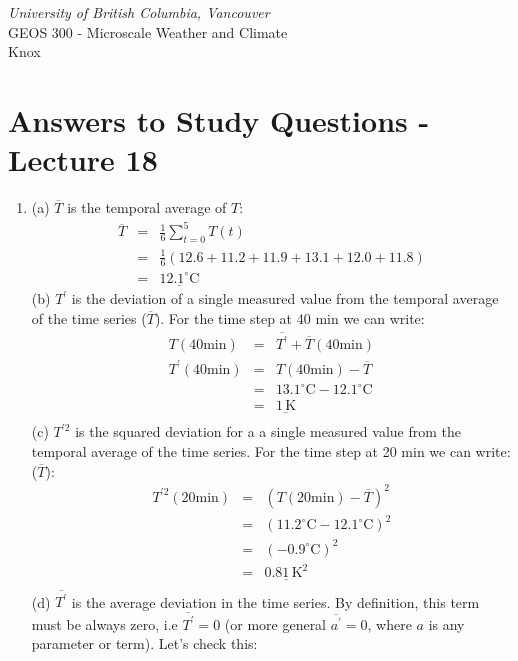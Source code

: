 \documentclass[11pt]{article}
\author{Andy Black and Andreas Christen}
\begin{document}
\begin{center}
\emph{University of British Columbia, Vancouver}\\
GEOS 300 - Microscale Weather and Climate\\
Knox
\section*{Answers to Study Questions - Lecture 18}
\end{center}

\begin{enumerate}

\item (a) $\overline{T}$ is the temporal average of $T$: \begin{eqnarray*}
\overline{T} &=& \frac{1}{6} \sum_{t=0}^{5} T(t) \\
&=& \frac{1}{6} \left(12.6 + 11.2 + 11.9 + 13.1 + 12.0 + 11.8 \right) \\
&=& \underline{12.1^{\circ}\textrm{C}}
\end{eqnarray*}
(b) $T^{\prime}$ is the deviation of a single measured value from the temporal average of the time series ($\overline{T}$). For the time step at 40 min we can write:  \begin{eqnarray*}
T(40\textrm{min}) &=& \overline{T^{\prime}} + \overline{T}(40\textrm{min}) \\
T^{\prime}(40\textrm{min}) &=& T(40\textrm{min}) - \overline{T} \\
 &=& 13.1^{\circ}\textrm{C} - 12.1^{\circ}\textrm{C} \\
 &=& \underline{1\, \textrm{K}}\\
\end{eqnarray*}
(c) $T^{\prime 2}$ is the squared deviation for a a single measured value from the temporal average of the time series. For the time step at 20 min we can write: ($\overline{T}$): \begin{eqnarray*}
T^{\prime 2}(20\textrm{min}) &=& (T(20\textrm{min}) - \overline{T})^2 \\
 &=& (11.2^{\circ}\textrm{C} - 12.1^{\circ}\textrm{C})^2 \\
 &=& (-0.9^{\circ}\textrm{C})^2 \\
 &=& \underline{0.81\, \textrm{K}^2}\\
\end{eqnarray*}
(d) $\overline{T^{\prime}}$ is the average deviation in the time series. By definition, this term must be always zero, i.e $\overline{T^{\prime}}=0$ (or more general $\overline{a^{\prime}} = 0$, where $a$ is any parameter or term). Let's check this: \begin{eqnarray*}

\end{eqnarray*}
\end{enumerate}
\end{document}
